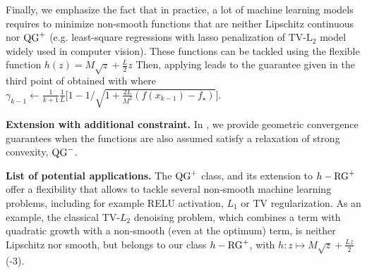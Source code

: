     Finally, we emphasize the fact that in practice, a lot of machine learning models requires to minimize non-smooth functions that are neither Lipschitz continuous nor $\operatorname{QG}^+$ (e.g. least-square regressions with lasso penalization of $\text{TV-L}_2$ model widely used in computer vision). These functions can be tackled using the flexible function $h(z) = M\sqrt{z} + \frac{L}{2}z$
    Then, applying  leads to the guarantee given in the third point of  obtained with  where $\gamma_{k-1} \gets \frac{1}{k+1}\frac{1}{L} \Big[ 1 - 1/\sqrt{1 + \frac{2L}{M^2}(f(x_{k-1}) - f_\star)} \Big]$.
    
        
    
\textbf{Extension with additional constraint.} In , we provide geometric convergence guarantees when the functions are also assumed satisfy a relaxation of strong convexity, $\operatorname{QG}^-$.

\textbf{List of potential applications.}
The $\operatorname{QG}^+$ class, and its extension to $h-\operatorname{RG}^+$ offer a flexibility that allows to tackle several non-smooth machine learning problems, including for example RELU activation, $L_1$ or TV regularization.
As an example, the classical TV-$L_2$ denoising problem, which combines a term with quadratic growth with a non-smooth (even at the optimum) term, is neither Lipschitz nor smooth, but belongs to our class $h-\operatorname{RG}^+$, with $h: z \mapsto M \sqrt{z}+\frac{L z}{2}$ (-3).

